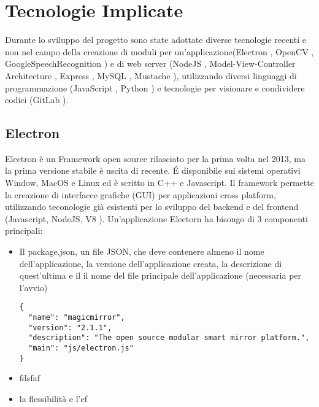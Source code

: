\chapter{Tecnologie Implicate}

Durante lo sviluppo del progetto sono state adottate diverse tecnologie recenti
e non nel campo della creazione di moduli per un'applicazione(Electron \cite{Electron-website},
OpenCV \cite{OpenCV-website}, GoogleSpeechRecognition \cite{GoogleSTT-website})
e di web server (NodeJS \cite{NodeJS-website},  Model-View-Controller Architecture \cite{MVC-Architecture},
Express \cite{Express-website}, MySQL \cite{MySQL}, Mustache \cite{Mustache}),
utilizzando diversi linguaggi di programmazione (JavaScript \cite{JavaScript}, Python \cite{Python})
e tecnologie per visionare e condividere codici (GitLab \cite{git-website}).

\section{Electron}
Electron è un Framework open source rilasciato per la prima volta nel 2013, ma la prima versione
stabile è uscita di recente. \'E disponibile sui sistemi operativi Window, MacOS e Linux ed è scritto
in C++ e Javascript. Il framework permette la creazione di interfacce grafiche (GUI) per
applicazioni cross platform, utilizzando teconologie già esistenti per lo sviluppo del backend e del frontend
(Javascript, NodeJS, V8 \cite{V8}).
Un'applicazione Electorn ha bisongo di 3 componenti principali:
\begin{itemize}
\item Il package.json, un file JSON, che deve contenere almeno il nome dell'applicazione,
la versione dell'applicazione creata, la descrizione di quest'ultima e il il nome del file principale dell'applicazione
(necessaria per l'avvio)
\begin{lstlisting}
{
  "name": "magicmirror",
  "version": "2.1.1",
  "description": "The open source modular smart mirror platform.",
  "main": "js/electron.js"
}
\end{lstlisting}
\item fdsfaf
\item la flessibilità e l'ef
\end{itemize}
